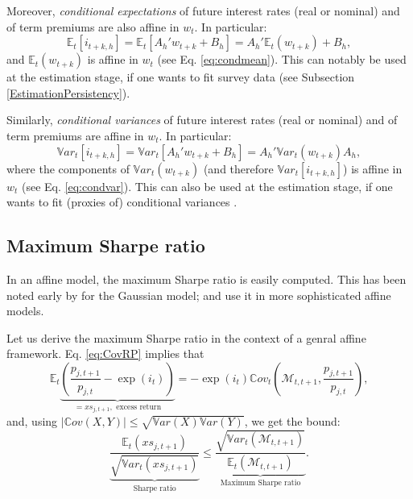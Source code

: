 \documentclass[
  12pt,
]{book}
\theoremstyle{definition}
\theoremstyle{definition}
\theoremstyle{definition}
\theoremstyle{definition}
\theoremstyle{remark}
\begin{document}
Moreover, \emph{conditional expectations} of future interest rates (real or nominal) and of term premiums are also affine in \(w_t\). In particular:
\begin{equation}
\mathbb{E}_t[i_{t+k,h}] = \mathbb{E}_t[{A_h}'w_{t+k} + B_h] = {A_h}'\mathbb{E}_t(w_{t+k}) + B_h,\label{eq:condmeanRth}
\end{equation}
and \(\mathbb{E}_t(w_{t+k})\) is affine in \(w_t\) (see Eq. \eqref{eq:condmean}). This can notably be used at the estimation stage, if one wants to fit survey data (see Subsection \ref{EstimationPersistency}).

Similarly, \emph{conditional variances} of future interest rates (real or nominal) and of term premiums are affine in \(w_t\). In particular:
\begin{equation}
\mathbb{V}ar_t[i_{t+k,h}] = \mathbb{V}ar_t[{A_h}'w_{t+k} + B_h] = {A_h}'\mathbb{V}ar_t(w_{t+k})A_h,\label{eq:condvarRth}
\end{equation}
where the components of \(\mathbb{V}ar_t(w_{t+k})\) (and therefore \(\mathbb{V}ar_t[i_{t+k,h}]\)) is affine in \(w_t\) (see Eq. \eqref{eq:condvar}). This can also be used at the estimation stage, if one wants to fit (proxies of) conditional variances \citep{zarg_2017}.

\hypertarget{maximum-sharpe-ratio}{%
\subsection{Maximum Sharpe ratio}\label{maximum-sharpe-ratio}}

In an affine model, the maximum Sharpe ratio is easily computed. This has been noted early by \citet{Duffee_2010} for the Gaussian model; \citet{Gourieroux_Monfort_Mouabbi_Renne_2021} and \citet{Pallara_Renne_2023} use it in more sophisticated affine models.

Let us derive the maximum Sharpe ratio in the context of a genral affine framework. Eq. \eqref{eq:CovRP} implies that
\[
\mathbb{E}_t\underbrace{\left(\frac{p_{j,t+1}}{p_{j,t}} - \exp(i_t)\right)}_{=xs_{j,t+1},\mbox{ excess return}} =  - \exp(i_t) \mathbb{C}ov_t\left(\mathcal{M}_{t,t+1},\frac{p_{j,t+1}}{p_{j,t}}\right),
\]
and, using \(|\mathbb{C}ov(X,Y)| \le \sqrt{\mathbb{V}ar(X)\mathbb{V}ar(Y)}\), we get the \citet{Hansen_Jagannathan_1991} bound:
\begin{equation}
\underbrace{\frac{\mathbb{E}_t(xs_{j,t+1})}{\sqrt{\mathbb{V}ar_t(xs_{j,t+1})}}}_{\mbox{Sharpe ratio}} \le \underbrace{\frac{\sqrt{\mathbb{V}ar_t(\mathcal{M}_{t,t+1})}}{\mathbb{E}_t(\mathcal{M}_{t,t+1})}}_{\mbox{Maximum Sharpe ratio}}.
\end{equation}
\end{document}
